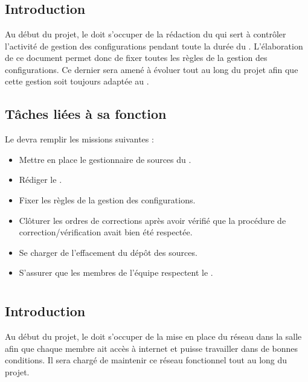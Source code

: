 \newpage
\section{\RGC}
\subsection*{Introduction}

Au début du projet, le \RGC{} doit s'occuper de la rédaction du \PGCCourt{} qui sert à contrôler l’activité de gestion des configurations pendant toute la durée du \PICCourt. L’élaboration de ce document permet donc de fixer toutes les règles de la gestion des configurations. Ce dernier sera amené à évoluer tout au long du projet afin que cette gestion soit toujours adaptée au \PICCourt.

\subsection*{Tâches liées à sa fonction}

Le \RGC{} devra remplir les missions suivantes :
\begin{itemize}
	\item Mettre en place le gestionnaire de sources du \PICCourt.
	\item Rédiger le \PGC.
	\item Fixer les règles de la gestion des configurations.
        \item Clôturer les ordres de corrections après avoir vérifié que la procédure de correction/vérification avait bien été respectée.
        \item Se charger de l'effacement du dépôt des sources.
        \item S'assurer que les membres de l'équipe \PICCourt{} respectent le \PGCCourt.
\end{itemize}

\newpage
\section{\RRS}
\subsection*{Introduction}

Au début du projet, le \RRS doit s'occuper de la mise en place du réseau dans la salle \PICCourt afin que chaque membre ait accès à internet et puisse travailler dans de bonnes conditions. Il sera chargé de maintenir ce réseau fonctionnel tout au long du projet.

